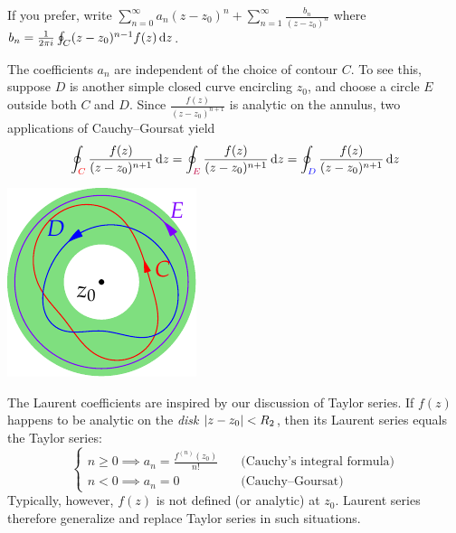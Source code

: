 \begin{itemize}
  \item If you prefer, write $\sum\limits_{n=0}^\infty a_n(z-z_0)^n+\sum\limits_{n=1}^\infty \frac{b_n}{(z-z_0)^n}$ where $b_n=\frac 1{2\pi i}\oint_C(z-z_0)^{n-1}f(z)\,{\mathrm{d} z}$.\par
  \begin{minipage}[t]{0.73\linewidth}\vspace{0pt}
		\item The coefficients $a_n$ are independent of the choice of contour $C$.\smallbreak
		To see this, suppose $D$ is another simple closed curve encircling $z_0$, and choose a circle $E$ outside both $C$ and $D$. Since $\frac{f(z)}{(z-z_0)^{n+1}}$ is analytic on the annulus, two applications of Cauchy--Goursat yield
	  \[
	  	\oint_{\textcolor{red}{C}}\frac{f(z)}{(z-z_0)^{n+1}}\,{\mathrm{d} z}
	  	=\oint_{\textcolor{purple}{E}}\frac{f(z)}{(z-z_0)^{n+1}}\,{\mathrm{d} z}
	  	=\oint_{\textcolor{blue}{D}}\frac{f(z)}{(z-z_0)^{n+1}}\,{\mathrm{d} z}
	  \]
	\end{minipage}
	\hfill
	\begin{minipage}[t]{0.26\linewidth}\vspace{-5pt}
		\flushright\includegraphics[scale=0.95]{laurent3}
	\end{minipage}\par
  
  \item The Laurent coefficients are inspired by our discussion of Taylor series. If $f(z)$ happens to be analytic on the \emph{disk} $\left| z-z_0\right|<R_2$, then its Laurent series equals the Taylor series:
	\[
		\begin{cases}
			n\ge 0\implies a_n=\frac{f^{(n)}(z_0)}{n!} \quad &\text{(Cauchy's integral formula)}\\
			n<0\implies a_n=0 \quad &\text{(Cauchy--Goursat)}
		\end{cases}
	\]
	Typically, however, $f(z)$ is not defined (or analytic) at $z_0$. Laurent series therefore generalize and replace Taylor series in such situations.
\end{itemize}

